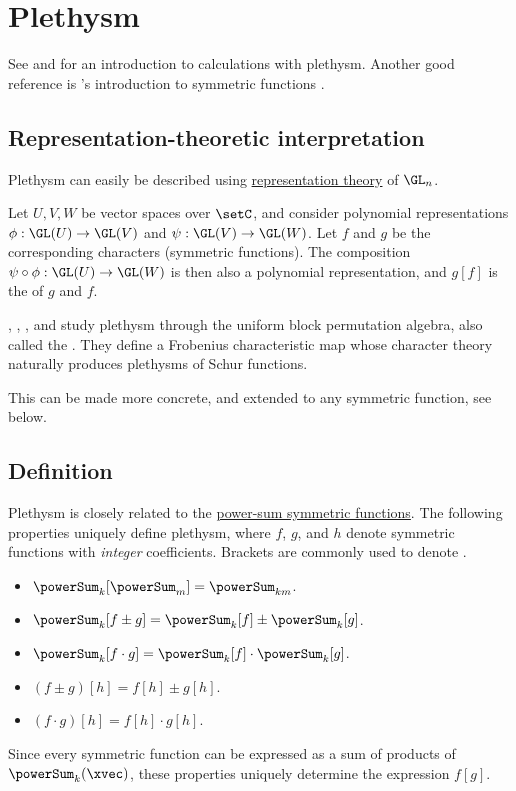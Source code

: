 

\section[plethysm]{Plethysm}


See \cite{qtCatalanBook} and \cite{LoehrRemmel2010} for an introduction to calculations with plethysm.
Another good reference is 's introduction to symmetric
functions \cite[Ch.~III]{Zabrocki2003}.



\subsection[plethysmGLn]{Representation-theoretic interpretation}

Plethysm can easily be described using \hyperref[representationGln]{representation theory} of $\GL_n$.

Let $U,V,W$ be vector spaces over $\setC$, and consider
polynomial representations $\phi : \GL(U) \to \GL(V)$ and $\psi : \GL(V) \to \GL(W)$.
Let $f$ and $g$ be the corresponding characters (symmetric functions).
The composition $\psi\circ \phi : \GL(U) \to \GL(W)$ is then also a polynomial representation,
and $g[f]$ is the \label{plethysmOperation} of $g$ and $f$.

, , , and
 study plethysm through the uniform block permutation
algebra, also called the
\label{partyAlgebra}
\cite{OrellanaSaliolaSchillingZabrocki2022Party}.
They define a Frobenius characteristic map whose character theory naturally
produces plethysms of Schur functions.

This can be made more concrete, and extended to any symmetric function, see below.

\subsection[plethysmDefinition]{Definition}

Plethysm is closely related to the \hyperref[powerSum]{power-sum symmetric functions}.
The following properties uniquely define plethysm, where $f$, $g$, and $h$
denote symmetric functions with \emph{integer} coefficients.
Brackets are commonly used to denote
\label{plethysticSubstitution}.
\begin{itemize}
\item $\powerSum_k[\powerSum_m] = \powerSum_{km}$.
\item $\powerSum_k[f\pm g] = \powerSum_k[f] \pm \powerSum_k[g]$.
\item $\powerSum_k[f\cdot g] = \powerSum_k[f] \cdot \powerSum_k[g]$.
\item $(f\pm g)[h] = f[h] \pm g[h]$.
\item $(f\cdot g)[h] = f[h] \cdot g[h]$.
\end{itemize}
Since every symmetric function can be expressed as a sum of products of
$\powerSum_k(\xvec)$, these properties uniquely determine the expression
$f[g]$.

